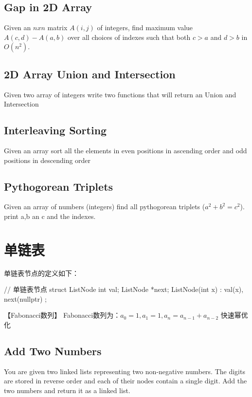 \subsection{Gap in 2D Array}
Given an $n x n$ matrix $A(i,j)$ of integers, find maximum value $A(c,d) - A(a,b)$ over all choices of indexes such that both $c > a$ and $d > b$ in $O(n^2)$.

\subsection{2D Array Union and Intersection}
Given two array of integers write two functions that will return an Union and Intersection

\subsection{Interleaving Sorting}
Given an array sort all the elements in even positions in ascending order and odd positions in descending order

\subsection{Pythogorean Triplets}
Given an array of numbers (integers) find all pythogorean triplets ($a^2 + b^2 = c^2$). print a,b an c and the indexes.

\section{单链表} %

单链表节点的定义如下：
\begin{Code}
	// 单链表节点
	struct ListNode {
		int val;
		ListNode *next;
		ListNode(int x) : val(x), next(nullptr) { }
	};
\end{Code}

【Fabonacci数列】
Fabonacci数列为：$a_0=1,a_1=1,a_n=a_{n-1}+a_{n-2}$
快速幂优化

\subsection{Add Two Numbers}
\label{sec:add-two-numbers}



You are given two linked lists representing two non-negative numbers. The
digits are stored in reverse order and each of their nodes contain a single
digit. Add the two numbers and return it as a linked list.

